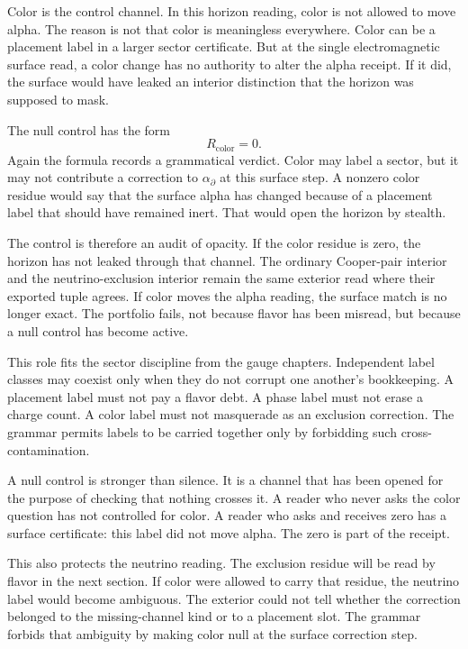 Color is the control channel. In this horizon reading, color is not allowed
to move alpha. The reason is not that color is meaningless everywhere. Color
can be a placement label in a larger sector certificate. But at the single
electromagnetic surface read, a color change has no authority to alter the
alpha receipt. If it did, the surface would have leaked an interior
distinction that the horizon was supposed to mask.

The null control has the form
\[
  R_{\mathrm{color}} = 0.
\]
Again the formula records a grammatical verdict. Color may label a sector,
but it may not contribute a correction to \(\alpha_{\partial}\) at this
surface step. A nonzero color residue would say that the surface alpha has
changed because of a placement label that should have remained inert. That
would open the horizon by stealth.

The control is therefore an audit of opacity. If the color residue is zero,
the horizon has not leaked through that channel. The ordinary Cooper-pair
interior and the neutrino-exclusion interior remain the same exterior read
where their exported tuple agrees. If color moves the alpha reading, the
surface match is no longer exact. The portfolio fails, not because flavor
has been misread, but because a null control has become active.

This role fits the sector discipline from the gauge chapters. Independent
label classes may coexist only when they do not corrupt one another's
bookkeeping. A placement label must not pay a flavor debt. A phase label
must not erase a charge count. A color label must not masquerade as an
exclusion correction. The grammar permits labels to be carried together
only by forbidding such cross-contamination.

A null control is stronger than silence. It is a channel that has been
opened for the purpose of checking that nothing crosses it. A reader who
never asks the color question has not controlled for color. A reader who
asks and receives zero has a surface certificate: this label did not move
alpha. The zero is part of the receipt.

This also protects the neutrino reading. The exclusion residue will be read
by flavor in the next section. If color were allowed to carry that residue,
the neutrino label would become ambiguous. The exterior could not tell
whether the correction belonged to the missing-channel kind or to a
placement slot. The grammar forbids that ambiguity by making color null at
the surface correction step.

